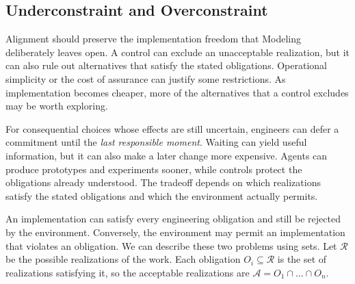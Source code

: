 \subsection{Underconstraint and Overconstraint}\label{heading:underconstraint-and-overconstraint}



Alignment should preserve the implementation freedom that Modeling deliberately leaves open. A control can exclude an unacceptable realization, but it can also rule out alternatives that satisfy the stated obligations. Operational simplicity or the cost of assurance can justify some restrictions. As implementation becomes cheaper, more of the alternatives that a control excludes may be worth exploring.


For consequential choices whose effects are still uncertain, engineers can defer a commitment until the \emph{last responsible moment}. Waiting can yield useful information, but it can also make a later change more expensive. Agents can produce prototypes and experiments sooner, while controls protect the obligations already understood. The tradeoff depends on which realizations satisfy the stated obligations and which the environment actually permits.


An implementation can satisfy every engineering obligation and still be rejected by the environment. Conversely, the environment may permit an implementation that violates an obligation. We can describe these two problems using sets. Let \(\mathcal R\) be the possible realizations of the work. Each obligation \(O_i \subseteq \mathcal R\) is the set of realizations satisfying it, so the acceptable realizations are \(\mathcal A = O_1 \cap \ldots \cap O_n\).

